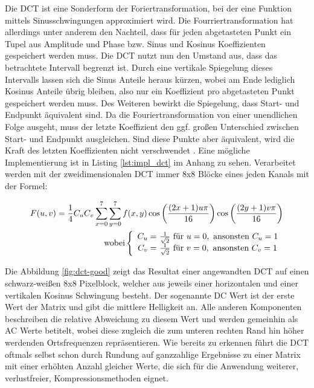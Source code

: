 Die DCT ist eine Sonderform der Foriertransformation, bei der eine Funktion mittels Sinusschwingungen approximiert wird. Die Fourriertransformation hat allerdings unter anderem den Nachteil, dass für jeden abgetasteten Punkt ein Tupel aus Amplitude und Phase bzw. Sinus und Kosinus Koeffizienten gespeichert werden muss. Die DCT nutzt nun den Umstand aus, dass das betrachtete Intervall begrenzt ist. Durch eine vertikale Spiegelung dieses Intervalls lassen sich die Sinus Anteile heraus kürzen, wobei am Ende lediglich Kosinus Anteile übrig bleiben, also nur ein Koeffizient pro abgetasteten Punkt gespeichert werden muss. Des Weiteren bewirkt die Spiegelung, dass Start- und Endpunkt äquivalent sind. Da die Fouriertransformation von einer unendlichen Folge ausgeht, muss der letzte Koeffizient den ggf. großen Unterschied zwischen Start- und Endpunkt ausgleichen. Sind diese Punkte aber äquivalent, wird die Kraft des letzten Koeffizienten nicht verschwendet \cite{symes_peter_digital_2004}. Eine mögliche Implementierung ist in Listing \ref{lst:impl_dct} im Anhang zu sehen. Verarbeitet werden mit der zweidimensionalen DCT immer 8x8 Blöcke eines jeden Kanals mit der Formel:

\thickmuskip
\begin{align*}
  F(u,v) = \frac{1}{4} C_uC_v\sum_{x=0}^7 \sum_{y=0}^7 f(x,y) \cos \left(\frac{(2x+1)u\pi}{16}\right) \cos\left(\frac{(2y+1)v\pi}{16}\right) \\
  \text{wobei} \left\lbrace
  \begin{array}{r@{}l}
	C_u = & \text{ } \frac{1}{\sqrt{2}} \text{ für } u=0, \text{ ansonsten } C_u=1\\
	C_v = & \text{ } \frac{1}{\sqrt{2}} \text{ für } v=0, \text{ ansonsten } C_v=1
  \end{array}
  \right.
\end{align*}

Die Abbildung \ref{fig:dct-good} zeigt das Resultat einer angewandten DCT auf einen schwarz-weißen 8x8 Pixelblock, welcher aus jeweils einer horizontalen und einer vertikalen Kosinus Schwingung besteht. Der sogenannte DC Wert ist der erste Wert der Matrix und gibt die mittlere Helligkeit an. Alle anderen Komponenten beschreiben die relative Abweichung zu diesem Wert und werden gemeinhin als AC Werte betitelt, wobei diese zugleich die zum unteren rechten Rand hin höher werdenden Ortsfrequenzen repräsentieren. Wie bereits zu erkennen führt die DCT oftmals selbst schon durch Rundung auf ganzzahlige Ergebnisse zu einer Matrix mit einer erhöhten Anzahl gleicher Werte, die sich für die Anwendung weiterer, verlustfreier, Kompressionsmethoden eignet.

